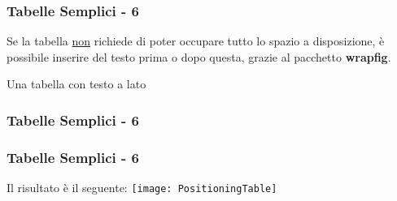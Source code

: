 \begin{frame}
  \frametitle{Tabelle Semplici - 6}
  Se la tabella \underline{non} richiede di poter occupare tutto lo spazio a disposizione, \`e possibile inserire del testo prima o dopo questa, grazie al pacchetto \textbf{wrapfig}.
  
\begin{esempio}{Una tabella con testo a lato}
\end{esempio}

\end{frame}

\begin{frame}
  \frametitle{Tabelle Semplici - 6}
  
\end{frame}

\begin{frame}
  \frametitle{Tabelle Semplici - 6}
  Il risultato \`e il seguente:
   \centering
   \texttt{[image: PositioningTable]}
\end{frame}